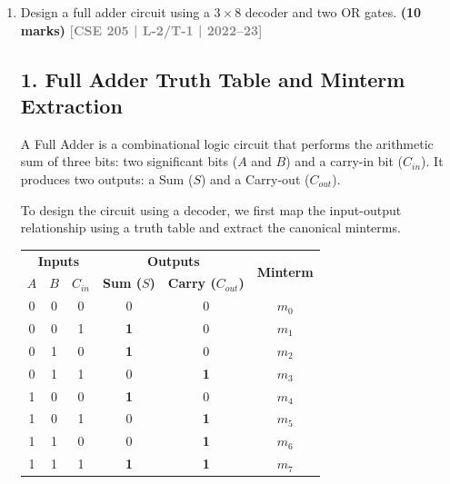 \documentclass[12pt,a3paper]{article}
\newcommand{\yr}[1]{\hfill\textcolor{gray}{\small\textbf{[#1]}}}
\newcommand{\mk}[1]{\textcolor{orange!70!black}{\small\textbf{(#1 marks)}}}
\begin{document}
\begin{enumerate}
\begin{tcolorbox}[enhanced,breakable,ansbox,colback=cD!4,colframe=cD,boxrule=0.8pt,arc=5pt,title={\textbf{Answer}},fonttitle=\bfseries\color{white},colbacktitle=cD]
\begin{center}
\begin{circuitikz}[scale=0.85, transform shape]
\end{circuitikz}
\end{center}

\end{tcolorbox}

\item Design a full adder circuit using a $3 \times 8$ decoder and two OR gates.
\mk{10} \yr{CSE 205 | L-2/T-1 | 2022--23}

\begin{tcolorbox}[enhanced,breakable,ansbox,colback=cD!4,colframe=cD,boxrule=0.8pt,arc=5pt,title={\textbf{Answer}},fonttitle=\bfseries\color{white},colbacktitle=cD]

\subsection*{1. Full Adder Truth Table and Minterm Extraction}

A Full Adder is a combinational logic circuit that performs the arithmetic sum of three bits: two significant bits ($A$ and $B$) and a carry-in bit ($C_{in}$). It produces two outputs: a Sum ($S$) and a Carry-out ($C_{out}$). 

To design the circuit using a decoder, we first map the input-output relationship using a truth table and extract the canonical minterms.

\begin{center}
\renewcommand{\arraystretch}{1.25}
\begin{tabular}{ccc|cc|c}
\toprule
\multicolumn{3}{c|}{\textbf{Inputs}} & \multicolumn{2}{c|}{\textbf{Outputs}} & \multirow{2}{*}{\textbf{Minterm}} \\
$A$ & $B$ & $C_{in}$ & \textbf{Sum ($S$)} & \textbf{Carry ($C_{out}$)} & \\
\midrule
0 & 0 & 0 & 0 & 0 & $m_0$ \\
0 & 0 & 1 & \textcolor{cD}{\textbf{1}} & 0 & \textcolor{cD}{\textbf{$m_1$}} \\
0 & 1 & 0 & \textcolor{cD}{\textbf{1}} & 0 & \textcolor{cD}{\textbf{$m_2$}} \\
0 & 1 & 1 & 0 & \textcolor{cD}{\textbf{1}} & \textcolor{cD}{\textbf{$m_3$}} \\
1 & 0 & 0 & \textcolor{cD}{\textbf{1}} & 0 & \textcolor{cD}{\textbf{$m_4$}} \\
1 & 0 & 1 & 0 & \textcolor{cD}{\textbf{1}} & \textcolor{cD}{\textbf{$m_5$}} \\
1 & 1 & 0 & 0 & \textcolor{cD}{\textbf{1}} & \textcolor{cD}{\textbf{$m_6$}} \\
1 & 1 & 1 & \textcolor{cD}{\textbf{1}} & \textcolor{cD}{\textbf{1}} & \textcolor{cD}{\textbf{$m_7$}} \\
\bottomrule
\end{tabular}
\end{center}


\end{tcolorbox}
\end{enumerate}
\end{document}
